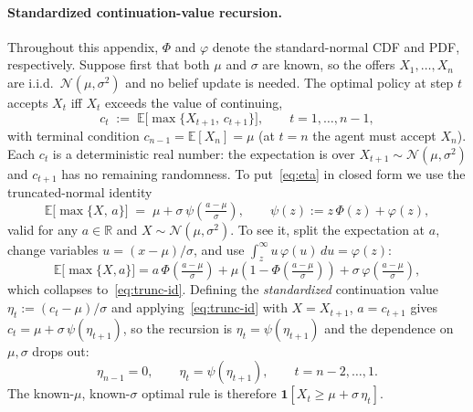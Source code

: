 \documentclass[11pt]{article}
\begin{document}
\paragraph{Standardized continuation-value recursion.} Throughout this appendix, $\Phi$ and $\varphi$ denote the standard-normal CDF and PDF, respectively. Suppose first that both $\mu$ and $\sigma$ are known, so the offers $X_1, \ldots, X_n$ are i.i.d.\ $\mathcal{N}(\mu, \sigma^2)$ and no belief update is needed. The optimal policy at step $t$ accepts $X_t$ iff $X_t$ exceeds the value of continuing,
\[
c_t \;:=\; \mathbb{E}\!\big[\max\{X_{t+1},\, c_{t+1}\}\big], \qquad t = 1, \ldots, n-1,
\]
with terminal condition $c_{n-1} = \mathbb{E}[X_n] = \mu$ (at $t = n$ the agent must accept $X_n$). Each $c_t$ is a deterministic real number: the expectation is over $X_{t+1} \sim \mathcal{N}(\mu, \sigma^2)$ and $c_{t+1}$ has no remaining randomness. To put~\eqref{eq:eta} in closed form we use the truncated-normal identity
\begin{equation}
\label{eq:trunc-id}
\mathbb{E}\!\big[\max\{X,\, a\}\big] \;=\; \mu + \sigma\,\psi\!\left(\tfrac{a - \mu}{\sigma}\right), \qquad \psi(z) := z\,\Phi(z) + \varphi(z),
\end{equation}
valid for any $a \in \mathbb{R}$ and $X \sim \mathcal{N}(\mu, \sigma^2)$. To see it, split the expectation at $a$, change variables $u = (x - \mu)/\sigma$, and use $\int_z^\infty u\,\varphi(u)\,du = \varphi(z)$:
\[
\mathbb{E}\!\big[\max\{X, a\}\big] = a\,\Phi\!\left(\tfrac{a-\mu}{\sigma}\right) + \mu\!\left(1 - \Phi\!\left(\tfrac{a-\mu}{\sigma}\right)\right) + \sigma\,\varphi\!\left(\tfrac{a-\mu}{\sigma}\right),
\]
which collapses to~\eqref{eq:trunc-id}. Defining the \emph{standardized} continuation value $\eta_t := (c_t - \mu)/\sigma$ and applying~\eqref{eq:trunc-id} with $X = X_{t+1}$, $a = c_{t+1}$ gives $c_t = \mu + \sigma\,\psi(\eta_{t+1})$, so the recursion is $\eta_t = \psi(\eta_{t+1})$ and the dependence on $\mu, \sigma$ drops out:
\begin{equation}
\label{eq:eta}
\eta_{n-1} = 0, \qquad \eta_t = \psi(\eta_{t+1}), \qquad t = n-2, \ldots, 1.
\end{equation}
The known-$\mu$, known-$\sigma$ optimal rule is therefore $\mathbf{1}[X_t \ge \mu + \sigma\,\eta_t]$.
\end{document}
